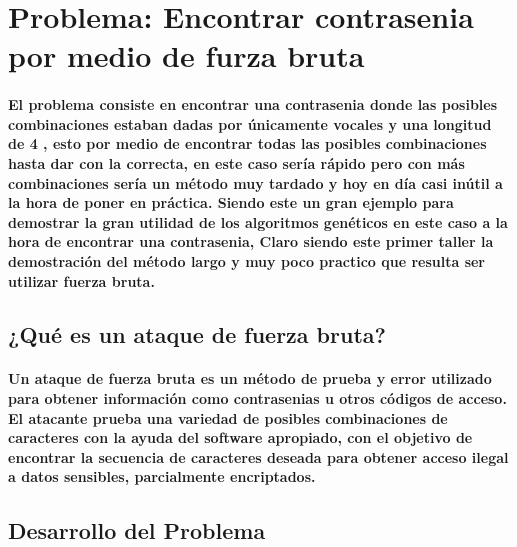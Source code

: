 \documentclass[10pt,a4paper]{article}
\begin{document}
{\begin{center}
\par\vspace{1.5cm}

\end{center}
\clearpage

}

\printindex

\section{
Problema: Encontrar contrasenia por medio de furza bruta
}

\paragraph{
El problema consiste en encontrar una contrasenia donde las posibles combinaciones estaban dadas por \'unicamente vocales y una longitud de 4 , esto por medio de encontrar todas las posibles combinaciones hasta dar con la correcta, en este caso ser\'ia r\'apido pero con m\'as combinaciones ser\'ia un m\'etodo muy tardado y hoy en d\'ia casi in\'util a la hora de poner en pr\'actica.
Siendo este un gran ejemplo para demostrar la gran utilidad de los algoritmos gen\'eticos en este caso a la hora de encontrar una contrasenia, Claro siendo este primer taller la demostraci\'on del m\'etodo largo y muy poco practico que resulta ser utilizar fuerza bruta.
}
\subsection*{¿Qu\'e es un ataque de fuerza bruta?
}
\paragraph{
Un ataque de fuerza bruta es un m\'etodo de prueba y error utilizado para obtener informaci\'on como contrasenias u otros c\'odigos de acceso. El atacante prueba una variedad de posibles combinaciones de caracteres con la ayuda del software apropiado, con el objetivo de encontrar la secuencia de caracteres deseada para obtener acceso ilegal a datos sensibles, parcialmente encriptados.
}





\subsection{Desarrollo del Problema}
\end{document}
